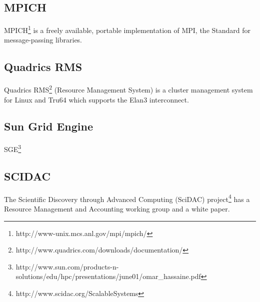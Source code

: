 \subsection{MPICH}

MPICH\footnote{http://www-unix.mcs.anl.gov/mpi/mpich/}
is a freely available, portable implementation of MPI,
the Standard for message-passing libraries.

\subsection{Quadrics RMS}

Quadrics
RMS\footnote{http://www.quadrics.com/downloads/documentation/}
(Resource Management System) is a cluster management system for 
Linux and Tru64 which supports the
Elan3 interconnect.  

\subsection{Sun Grid Engine}

SGE\footnote{http://www.sun.com/products-n-solutions/edu/hpc/presentations/june01/omar\_hassaine.pdf}


\subsection{SCIDAC}

The Scientific Discovery through Advanced Computing (SciDAC) 
project\footnote{http://www.scidac.org/ScalableSystems}
has a Resource Management and Accounting working group
and a white paper\cite{Res2000}.

\newpage


